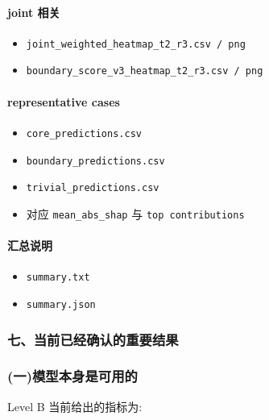 \documentclass[lang=cn,scheme=chinese,color=blue,device=normal,toc=onecol,math=cm]{elegantbook}
\begin{document}
\paragraph{joint 相关}


\begin{itemize}
\item \texttt{joint\_\allowbreak{}weighted\_\allowbreak{}heatmap\_\allowbreak{}t2\_\allowbreak{}r3.csv /\allowbreak{} png}
\item \texttt{boundary\_\allowbreak{}score\_\allowbreak{}v3\_\allowbreak{}heatmap\_\allowbreak{}t2\_\allowbreak{}r3.csv /\allowbreak{} png}
\end{itemize}


\paragraph{representative cases}


\begin{itemize}
\item \texttt{core\_\allowbreak{}predictions.csv}
\item \texttt{boundary\_\allowbreak{}predictions.csv}
\item \texttt{trivial\_\allowbreak{}predictions.csv}
\item 对应 \texttt{mean\_\allowbreak{}abs\_\allowbreak{}shap} 与 \texttt{top contributions}
\end{itemize}


\paragraph{汇总说明}


\begin{itemize}
\item \texttt{summary.txt}
\item \texttt{summary.json}
\end{itemize}


\subsubsection{七、当前已经确认的重要结果}


\subsubsection{(一)模型本身是可用的}


Level B 当前给出的指标为:\par
\end{document}

